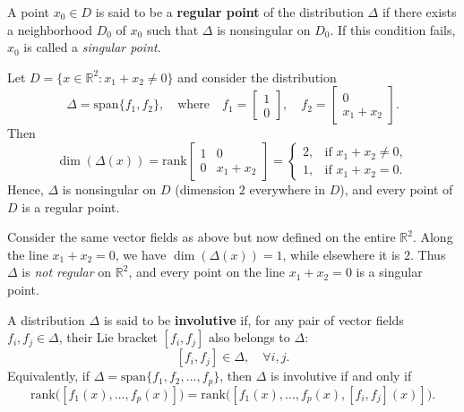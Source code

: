 \begin{definition}\label{def:regular_point}
A point $x_0 \in D$ is said to be a \textbf{regular point} of the distribution $\Delta$
if there exists a neighborhood $D_0$ of $x_0$ such that $\Delta$ is nonsingular on $D_0$.  
If this condition fails, $x_0$ is called a \emph{singular point}.
\end{definition}

\begin{example}
Let $D = \{ x \in \mathbb{R}^2 : x_1 + x_2 \neq 0 \}$ and consider the distribution
\[
\Delta = \mathrm{span}\{ f_1, f_2 \},
\quad \text{where} \quad
f_1 =
\begin{bmatrix}
1 \\[3pt]
0
\end{bmatrix},
\quad
f_2 =
\begin{bmatrix}
0 \\[3pt]
x_1 + x_2
\end{bmatrix}.
\]
Then
\[
\dim(\Delta(x)) = \mathrm{rank}
\begin{bmatrix}
1 & 0 \\[3pt]
0 & x_1 + x_2
\end{bmatrix}
=
\begin{cases}
2, & \text{if } x_1 + x_2 \neq 0,\\
1, & \text{if } x_1 + x_2 = 0.
\end{cases}
\]
Hence, $\Delta$ is nonsingular on $D$ (dimension $2$ everywhere in $D$),  
and every point of $D$ is a regular point.
\end{example}

\begin{example}
Consider the same vector fields as above but now defined on the entire $\mathbb{R}^2$.  
Along the line $x_1 + x_2 = 0$, we have $\dim(\Delta(x)) = 1$, while elsewhere it is $2$.  
Thus $\Delta$ is \emph{not regular} on $\mathbb{R}^2$, and every point on the line $x_1 + x_2 = 0$  
is a singular point.
\end{example}

\begin{definition}\label{def:involutive_distribution}
A distribution $\Delta$ is said to be \textbf{involutive} if, for any pair of vector fields 
$f_i, f_j \in \Delta$, their Lie bracket $[f_i, f_j]$ also belongs to $\Delta$:
\[
[f_i, f_j] \in \Delta, \quad \forall i,j.
\]
Equivalently, if $\Delta = \mathrm{span}\{ f_1, f_2, \ldots, f_p \}$,  
then $\Delta$ is involutive if and only if
\[
\mathrm{rank} \big( [f_1(x), \ldots, f_p(x)] \big)
=
\mathrm{rank} \big( [f_1(x), \ldots, f_p(x), [f_i, f_j](x)] \big).
\]
\end{definition}

